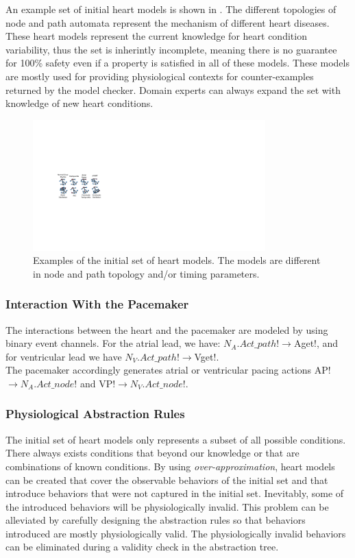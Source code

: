 An example set of initial heart models is shown in .
The different topologies of node and path automata represent the mechanism of different heart diseases.
These heart models represent the current knowledge for heart condition variability, thus the set is inherintly incomplete, meaning there is no guarantee for 100\% safety even if a property is satisfied in all of these models.
These models are mostly used for providing physiological contexts for counter-examples returned by the model checker.
Domain experts can always expand the set with knowledge of new heart conditions.
\begin{figure}[!h]
	\centering
	\includegraphics[width=0.8\textwidth]{figs/init.pdf}
	\caption{\small Examples of the initial set of heart models. The models are different in node and path topology and/or timing parameters.}
	\label{fig:init}
\end{figure}
\subsubsection{Interaction With the Pacemaker}
The interactions between the heart and the pacemaker are modeled by using binary event channels. For the atrial lead, we have:
\textsf{$N_A.Act\_path!\rightarrow$Aget!},
and for ventricular lead we have
\textsf{$N_V.Act\_path!\rightarrow$Vget!}.\\
The pacemaker accordingly generates atrial or ventricular pacing actions \textsf{AP!$\rightarrow N_A.Act\_node!$} and \textsf{VP!$\rightarrow N_V.Act\_node!$}.
\subsubsection{Physiological Abstraction Rules}
The initial set of heart models only represents a subset of all possible conditions.
There always exists conditions that beyond our knowledge or that are combinations of known conditions.
By using \emph{over-approximation}, heart models can be created that cover the observable behaviors of the initial set and that introduce behaviors that were not captured in the initial set.
Inevitably, some of the introduced behaviors will be physiologically invalid.
This problem can be alleviated by carefully designing the abstraction rules so that behaviors introduced are mostly physiologically valid.
The physiologically invalid behaviors can be eliminated during a validity check in the abstraction tree.


